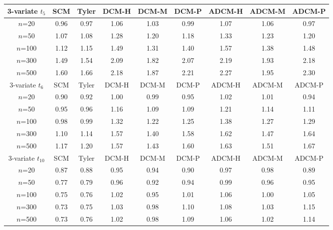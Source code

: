 \begin{table}[t]
\begin{scriptsize}
   \begin{tabular}{c|cc|ccc|ccc}
    \hline
    3-variate $t_5$    & SCM  & Tyler & DCM-H & DCM-M & DCM-P & ADCM-H & ADCM-M & ADCM-P \\ \hline
    $n$=20             & 0.96 & 0.97  & 1.06   & 1.03   & 0.99  & 1.07    & 1.06    & 0.97   \\
    $n$=50             & 1.07 & 1.08  & 1.28   & 1.20   & 1.18  & 1.33    & 1.23    & 1.20   \\
    $n$=100            & 1.12 & 1.15  & 1.49   & 1.31   & 1.40  & 1.57    & 1.38    & 1.48   \\
    $n$=300            & 1.49 & 1.54  & 2.09   & 1.82   & 2.07  & 2.19    & 1.93    & 2.18   \\
    $n$=500            & 1.60 & 1.66  & 2.18   & 1.87   & 2.21  & 2.27    & 1.95    & 2.30   \\ \hline
    3-variate $t_6$    & SCM  & Tyler & DCM-H & DCM-M & DCM-P & ADCM-H & ADCM-M & ADCM-P \\ \hline
    $n$=20             & 0.90 & 0.92  & 1.00   & 0.99   & 0.95  & 1.02    & 1.01    & 0.94   \\
    $n$=50             & 0.95 & 0.96  & 1.16   & 1.09   & 1.09  & 1.21    & 1.14    & 1.11   \\
    $n$=100            & 0.98 & 0.99  & 1.32   & 1.22   & 1.25  & 1.38    & 1.27    & 1.29   \\
    $n$=300            & 1.10 & 1.14  & 1.57   & 1.40   & 1.58  & 1.62    & 1.47    & 1.64   \\
    $n$=500            & 1.17 & 1.20  & 1.57   & 1.43   & 1.60  & 1.63    & 1.51    & 1.67   \\ \hline
    3-variate $t_{10}$ & SCM  & Tyler & DCM-H & DCM-M & DCM-P & ADCM-H & ADCM-M & ADCM-P \\ \hline
    $n$=20             & 0.87 & 0.88  & 0.95   & 0.94   & 0.90  & 0.97    & 0.98    & 0.89   \\
    $n$=50             & 0.77 & 0.79  & 0.96   & 0.92   & 0.94  & 0.99    & 0.96    & 0.95   \\
    $n$=100            & 0.75 & 0.76  & 1.02   & 0.95   & 1.01  & 1.06    & 1.00    & 1.05   \\
    $n$=300            & 0.73 & 0.75  & 1.03   & 0.98   & 1.10  & 1.08    & 1.03    & 1.15   \\
    $n$=500            & 0.73 & 0.76  & 1.02   & 0.98   & 1.09  & 1.06    & 1.02    & 1.14   \\ \hline

\end{tabular}
\end{scriptsize}
\end{table}
